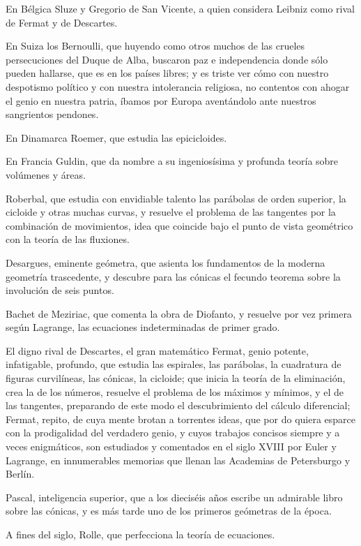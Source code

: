 \documentclass[a4paper, 12pt]{article}
\begin{document}
{{{{En Bélgica Sluze y Gregorio de San Vicente, a quien considera Leibniz como rival de Fermat y de Descartes.

En Suiza los Bernoulli, que huyendo como otros muchos de las crueles persecuciones del Duque de Alba, buscaron paz e independencia donde sólo pueden hallarse, que es en los países libres; y es triste ver cómo con nuestro despotismo político y con nuestra intolerancia religiosa, no contentos con ahogar el genio en nuestra patria, íbamos por Europa aventándolo ante nuestros sangrientos pendones.

En Dinamarca Roemer, que estudia las epicicloides.

En Francia Guldin, que da nombre a su ingeniosísima y profunda teoría sobre volúmenes y áreas.

Roberbal, que estudia con envidiable talento las parábolas de orden superior, la cicloide y otras muchas curvas, y resuelve el problema de las tangentes por la combinación de movimientos, idea que coincide bajo el punto de vista geométrico con la teoría de las fluxiones. 

Desargues, eminente geómetra, que asienta los fundamentos de la moderna geometría trascedente, y descubre para las cónicas el fecundo teorema sobre la involución de seis puntos.

Bachet de Meziriac, que comenta la obra de Diofanto, y resuelve por vez primera según Lagrange, las ecuaciones indeterminadas de primer grado.

El digno rival de Descartes, el gran matemático Fermat, genio potente, infatigable, profundo, que estudia las espirales, las parábolas, la cuadratura de figuras curvilíneas, las cónicas, la cicloide; que inicia la teoría de la eliminación, crea la de los números, resuelve el problema de los máximos y mínimos, y el de las tangentes, preparando de este modo el descubrimiento del cálculo diferencial; Fermat, repito, de cuya mente brotan a torrentes ideas, que por do quiera esparce con la prodigalidad del verdadero genio, y cuyos trabajos concisos siempre y a veces enigmáticos, son estudiados y comentados en el siglo XVIII por Euler y Lagrange, en innumerables memorias que llenan las Academias de Petersburgo y Berlín.

Pascal, inteligencia superior, que a los dieciséis años escribe un admirable libro sobre las cónicas, y es más tarde uno de los primeros geómetras de la época.

A fines del siglo, Rolle, que perfecciona la teoría de ecuaciones.

}}}}
\end{document}
